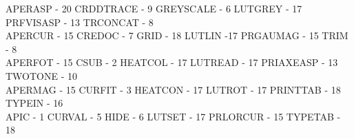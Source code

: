 {\begin{tabbing}
 APERASP - 20                            \>CRDDTRACE - 9
   \>GREYSCALE - 6                           \>
 LUTGREY - 17                            \>PRFVISASP - 13
   \>TRCONCAT - 8                            \\
 APERCUR - 15                            \>CREDOC - 7
   \>GRID - 18                               \>
 LUTLIN -17                              \>PRGAUMAG - 15
   \>TRIM - 8                                \\
 APERFOT - 15                            \>CSUB - 2
   \>HEATCOL - 17                            \>
 LUTREAD - 17                            \>PRIAXEASP - 13
   \>TWOTONE - 10                            \\
 APERMAG - 15                            \>CURFIT - 3
   \>HEATCON - 17                            \>
 LUTROT - 17                             \>PRINTTAB - 18
   \>TYPEIN - 16                             \\
 APIC - 1                                \>CURVAL - 5
   \>HIDE - 6                                \>
 LUTSET - 17                             \>PRLORCUR - 15
   \>TYPETAB - 18                            \\
\end{tabbing}

\vspace{-8mm}

}
